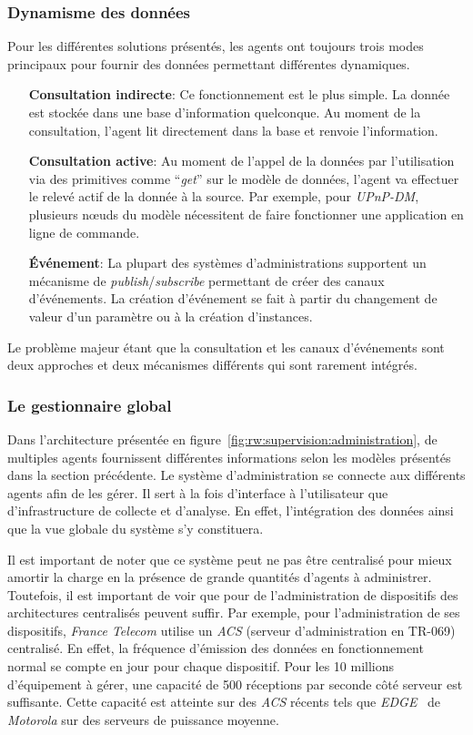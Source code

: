 \subsubsection{Dynamisme des données}
Pour les différentes solutions présentés, les agents ont toujours trois modes principaux pour fournir des données permettant différentes dynamiques.
\begin{itemize}
	\item[\textbf{Consultation indirecte}: ] Ce fonctionnement est le plus simple. La donnée est stockée dans une base d'information quelconque. Au moment de la consultation, l'agent lit directement dans la base et renvoie l'information.
	\item[\textbf{Consultation active}: ] Au moment de l'appel de la données par l'utilisation via des primitives comme \enquote{\it get} sur le modèle de données, l'agent va effectuer le relevé actif de la donnée à la source. Par exemple, pour \textit{UPnP-DM}, plusieurs nœuds du modèle nécessitent de faire fonctionner une application en ligne de commande.
	\item[\textbf{Événement}: ] La plupart des systèmes d'administrations supportent un mécanisme de \textit{publish}/\textit{subscribe} permettant de créer des canaux d'événements. La création d'événement se fait à partir du changement de valeur d'un paramètre ou à la création d'instances.
\end{itemize}

Le problème majeur étant que la consultation et les canaux d'événements sont deux approches et deux mécanismes différents qui sont rarement intégrés.

\subsubsection{Le gestionnaire global}
Dans l'architecture présentée en figure~\ref{fig:rw:supervision:administration}, de multiples agents fournissent différentes informations selon les modèles présentés dans la section précédente. Le système d'administration se connecte aux différents agents afin de les gérer. Il sert à la fois d'interface à l'utilisateur que d'infrastructure de collecte et d'analyse. En effet, l'intégration des données ainsi que la vue globale du système s'y constituera.

Il est important de noter que ce système peut ne pas être centralisé pour mieux amortir la charge en la présence de grande quantités d'agents à administrer. Toutefois, il est important de voir que pour de l'administration de dispositifs des architectures centralisés peuvent suffir. Par exemple, pour l'administration de ses dispositifs, \textit{France Telecom} utilise un \textit{ACS} (serveur d'administration en TR-069) centralisé. En effet, la fréquence d'émission des données en fonctionnement normal se compte en jour pour chaque dispositif. Pour les 10 millions d'équipement à gérer, une capacité de 500 réceptions par seconde côté serveur est suffisante. Cette capacité est atteinte sur des \textit{ACS} récents tels que \textit{EDGE}~\cite{Motorola:EDGE} de \textit{Motorola} sur des serveurs de puissance moyenne.


